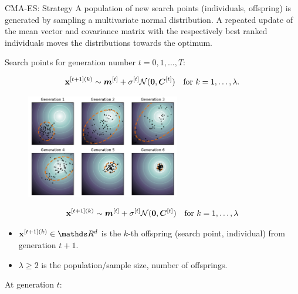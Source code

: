 \documentclass[11pt,compress,t,notes=noshow, xcolor=table]{beamer}
\begin{document}
\begin{vbframe}{CMA-ES: Strategy}
A population of new search points (individuals, offspring) is generated by sampling a multivariate normal distribution. A repeated update of the mean vector and covariance matrix with the respectively best ranked individuals moves the distributions towards the optimum.

Search points for generation number $t = 0, 1, \dots, T$:

\vspace{-10pt}

\begin{eqnarray*}
\mathbf{x}^{[t+1](k)} \sim \bm{m}^{[t]} + \sigma^{[t]} \mathcal{N} (\bm{0}, \bm{C}^{[t]}) \quad \text{for } k = 1, \dots, \lambda.
\end{eqnarray*}
\vspace{-20pt}

\begin{figure}
  \includegraphics[width=0.6\textwidth, height=0.45\textheight]{figure_man/cmaes/cmaes_generations.png}
\end{figure}

\framebreak

\vspace{-30pt}
\begin{eqnarray*}
\mathbf{x}^{[t+1](k)} \sim \bm{m}^{[t]} + \sigma^{[t]} \mathcal{N} (\bm{0}, \bm{C}^{[t]}) \quad \text{for } k = 1, \dots, \lambda
\end{eqnarray*}

\begin{itemize}
\item $\xv^{[t+1](k)} \in \R^d$ is the $k$-th offspring (search point, individual) from generation $t+1$.
\item $\lambda \geq 2$ is the population/sample size, number of offsprings.
\end{itemize}

At generation $t$:


\end{vbframe}
\end{document}
